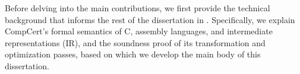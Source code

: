Before delving into the main contributions, we first provide the technical background that informs
the rest of the dissertation in .  Specifically, we explain CompCert's formal
semantics of C, assembly languages, and intermediate representations (IR), and the soundness proof
of its transformation and optimization passes, based on which we develop the main body of this
dissertation.


%


